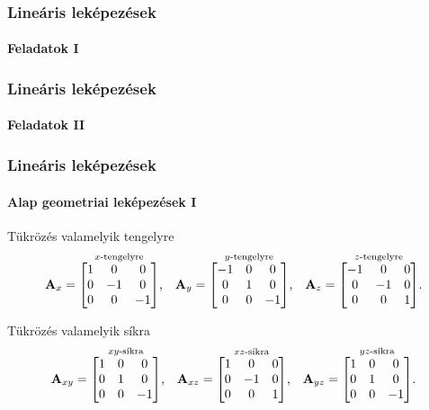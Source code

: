 \begin{frame}
  \frametitle{Lineáris leképezések}
  \framesubtitle{Feladatok I}

  
\end{frame}

\begin{frame}
  \frametitle{Lineáris leképezések}
  \framesubtitle{Feladatok II}

  
\end{frame}

\begin{frame}
  \frametitle{Lineáris leképezések}
  \framesubtitle{Alap geometriai leképezések I}

  \begin{block}{Tükrözés valamelyik tengelyre}
    \[
      \mathbf{A}_x = \overset{x\text{-tengelyre}}{\begin{bmatrix}
          1 & 0  & 0  \\
          0 & -1 & 0  \\
          0 & 0  & -1
        \end{bmatrix}}
      \text,
      \quad
      \mathbf{A}_y = \overset{y\text{-tengelyre}}{\begin{bmatrix}
          -1 & 0 & 0  \\
          0  & 1 & 0  \\
          0  & 0 & -1
        \end{bmatrix}}
      \text,
      \quad
      \mathbf{A}_z = \overset{z\text{-tengelyre}}{\begin{bmatrix}
          -1 & 0  & 0 \\
          0  & -1 & 0 \\
          0  & 0  & 1
        \end{bmatrix}}
      \text.
    \]
  \end{block}

  \begin{block}{Tükrözés valamelyik síkra}
    \[
      \mathbf{A}_{xy} = \overset{xy\text{-síkra}}{\begin{bmatrix}
          1 & 0 & 0  \\
          0 & 1 & 0  \\
          0 & 0 & -1
        \end{bmatrix}}
      \text,
      \quad
      \mathbf{A}_{xz} = \overset{xz\text{-síkra}}{\begin{bmatrix}
          1 & 0  & 0 \\
          0 & -1 & 0 \\
          0 & 0  & 1
        \end{bmatrix}}
      \text,
      \quad
      \mathbf{A}_{yz} = \overset{yz\text{-síkra}}{\begin{bmatrix}
          1 & 0 & 0  \\
          0 & 1 & 0  \\
          0 & 0 & -1
        \end{bmatrix}}
      \text.
    \]
  \end{block}
\end{frame}

